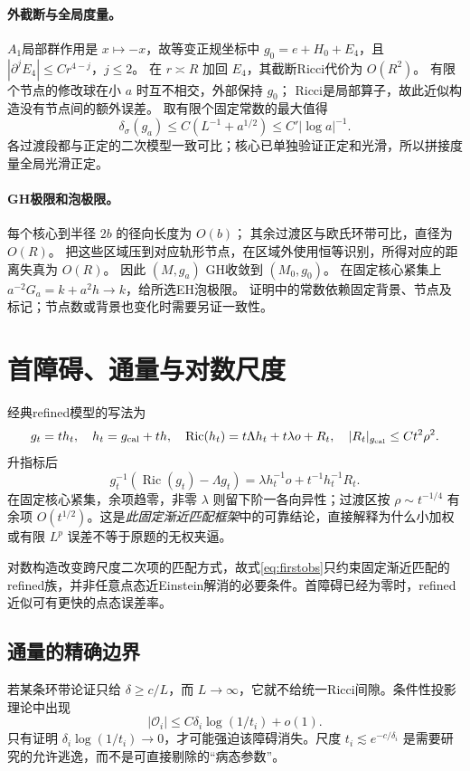 \documentclass[UTF8,a4paper,11pt,fontset=fandol]{ctexart}
\numberwithin{equation}{section}
\theoremstyle{definition}
\newcommand{\Ric}{\operatorname{Ric}}
\begin{document}
\paragraph{外截断与全局度量。}
$A_1$局部群作用是 $x\mapsto-x$，故等变正规坐标中
$g_0=e+H_0+E_4$，且
$|\partial^jE_4|\le Cr^{4-j}$，$j\le2$。
在 $r\asymp R$ 加回 $E_4$，其截断Ricci代价为 $O(R^2)$。
有限个节点的修改球在小 $a$ 时互不相交，外部保持 $g_0$；
Ricci是局部算子，故此近似构造没有节点间的额外误差。
取有限个固定常数的最大值得
\[
\delta_\sigma(g_a)\le C(L^{-1}+a^{1/2})
\le C'|\log a|^{-1}.
\]
各过渡段都与正定的二次模型一致可比；核心已单独验证正定和光滑，所以拼接度量全局光滑正定。

\paragraph{GH极限和泡极限。}
每个核心到半径 $2b$ 的径向长度为 $O(b)$；
其余过渡区与欧氏环带可比，直径为 $O(R)$。
把这些区域压到对应轨形节点，在区域外使用恒等识别，所得对应的距离失真为 $O(R)$。
因此 $(M,g_a)$ GH收敛到 $(M_0,g_0)$。
在固定核心紧集上 $a^{-2}G_a=k+a^2h\to k$，给所选EH泡极限。
证明中的常数依赖固定背景、节点及标记；节点数或背景也变化时需要另证一致性。

\section{首障碍、通量与对数尺度}
经典refined模型的写法为
\[
g_t=t h_t,\quad h_t=g_{\rm cal}+th,\quad
\Ric(h_t)=t\Lambda h_t+t\lambda o+R_t,
\quad |R_t|_{g_{\rm cal}}\le Ct^2\rho^2.
\]
升指标后
\begin{equation}\label{eq:firstobs}
g_t^{-1}(\Ric(g_t)-\Lambda g_t)
=\lambda h_t^{-1}o+t^{-1}h_t^{-1}R_t.
\end{equation}
在固定核心紧集，余项趋零，非零 $\lambda$ 则留下阶一各向异性；过渡区按 $\rho\sim t^{-1/4}$ 有余项 $O(t^{1/2})$。这是\emph{此固定渐近匹配框架}中的可靠结论，直接解释为什么小加权或有限 $L^p$ 误差不等于原题的无权夹逼\cite{MV,Biquard}。

对数构造改变跨尺度二次项的匹配方式，故式\eqref{eq:firstobs}只约束固定渐近匹配的refined族，并非任意点态近Einstein解消的必要条件。首障碍已经为零时，refined近似可有更快的点态误差率。

\subsection{通量的精确边界}
若某条环带论证只给 $\delta\ge c/L$，而 $L\to\infty$，它就不给统一Ricci间隙。条件性投影理论中出现
\[
|\mathcal O_i|\le C\delta_i\log(1/t_i)+o(1).
\]
只有证明 $\delta_i\log(1/t_i)\to0$，才可能强迫该障碍消失。尺度 $t_i\lesssim e^{-c/\delta_i}$ 是需要研究的允许逃逸，而不是可直接剔除的“病态参数”。
\end{document}
